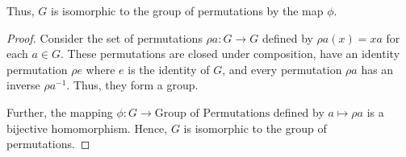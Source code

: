 \documentclass[12pt]{amsart}
\theoremstyle{definition}
\numberwithin{equation}{section}
\theoremstyle{plain}
\begin{document}
\begin{exercise}{52}
    Thus, \( G \) is isomorphic to the group of permutations by the map \( \phi \).
    
    \begin{proof}
    Consider the set of permutations \( \rho a: G \rightarrow G \) defined by \( \rho a(x) = xa \) for each \( a \in G \). These permutations are closed under composition, have an identity permutation \( \rho e \) where \( e \) is the identity of \( G \), and every permutation \( \rho a \) has an inverse \( \rho a^{-1} \). Thus, they form a group. 
    
    Further, the mapping \( \phi: G \rightarrow \text{Group of Permutations} \) defined by \( a \mapsto \rho a \) is a bijective homomorphism. Hence, \( G \) is isomorphic to the group of permutations.
    
\end{proof}
\end{exercise}
\vspace*{60pt}
\end{document}
